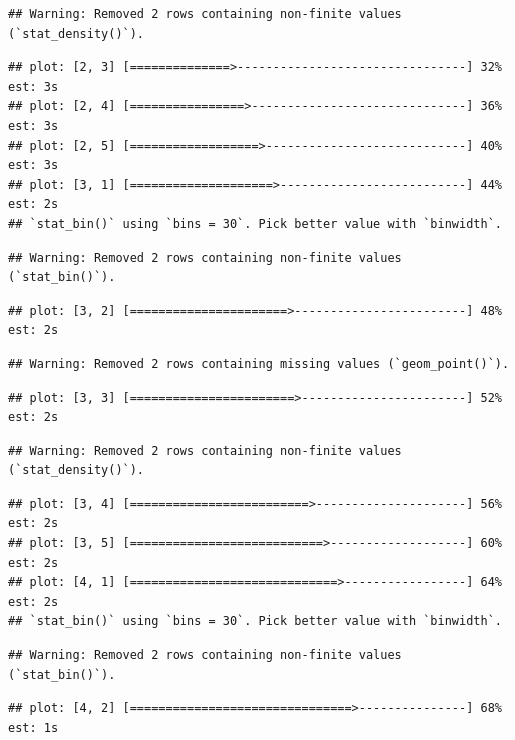 \documentclass[
]{article}
\begin{document}
\begin{verbatim}
## Warning: Removed 2 rows containing non-finite values (`stat_density()`).
\end{verbatim}

\begin{verbatim}
## plot: [2, 3] [==============>--------------------------------] 32% est: 3s
## plot: [2, 4] [================>------------------------------] 36% est: 3s
## plot: [2, 5] [==================>----------------------------] 40% est: 3s
## plot: [3, 1] [====================>--------------------------] 44% est: 2s
## `stat_bin()` using `bins = 30`. Pick better value with `binwidth`.
\end{verbatim}

\begin{verbatim}
## Warning: Removed 2 rows containing non-finite values (`stat_bin()`).
\end{verbatim}

\begin{verbatim}
## plot: [3, 2] [======================>------------------------] 48% est: 2s
\end{verbatim}

\begin{verbatim}
## Warning: Removed 2 rows containing missing values (`geom_point()`).
\end{verbatim}

\begin{verbatim}
## plot: [3, 3] [=======================>-----------------------] 52% est: 2s
\end{verbatim}

\begin{verbatim}
## Warning: Removed 2 rows containing non-finite values (`stat_density()`).
\end{verbatim}

\begin{verbatim}
## plot: [3, 4] [=========================>---------------------] 56% est: 2s
## plot: [3, 5] [===========================>-------------------] 60% est: 2s
## plot: [4, 1] [=============================>-----------------] 64% est: 2s
## `stat_bin()` using `bins = 30`. Pick better value with `binwidth`.
\end{verbatim}

\begin{verbatim}
## Warning: Removed 2 rows containing non-finite values (`stat_bin()`).
\end{verbatim}

\begin{verbatim}
## plot: [4, 2] [===============================>---------------] 68% est: 1s
\end{verbatim}
\end{document}
